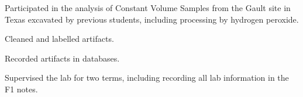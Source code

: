 \documentclass[letterpaper]{resume}
\begin{document}
\begin{compactitem}
\item Participated in the analysis of Constant Volume Samples from the Gault site in Texas excavated by previous students, including processing by hydrogen peroxide.
\item Cleaned and labelled artifacts.
\item Recorded artifacts in databases.
\item Supervised the lab for two terms, including recording all lab information in the F1 notes.
\end{compactitem}
%

\end{document}
